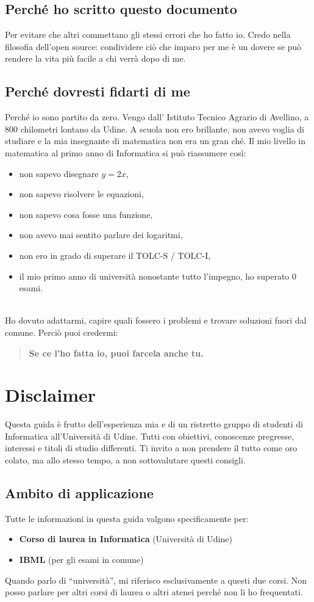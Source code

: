 \documentclass{article}
\begin{document}
\subsection{Perché ho scritto questo documento}
Per evitare che altri commettano gli stessi errori che ho fatto io.  
Credo nella filosofia dell’open source: condividere ciò che imparo per me è un dovere se può rendere la vita più facile a chi verrà dopo di me.\\


\subsection{Perché dovresti fidarti di me}
Perché io sono partito da zero.  
Vengo dall' Istituto Tecnico Agrario di Avellino, a 800 chilometri lontano da Udine. 
A scuola non ero brillante, non avevo voglia di studiare e la mia insegnante di matematica non era un gran ché.  
Il mio livello in matematica al primo anno di Informatica si può riassumere così:
\begin{itemize}
\item non sapevo disegnare $y = 2x$,
\item non sapevo risolvere le equazioni,
\item non sapevo cosa fosse una funzione,
\item non avevo mai sentito parlare dei logaritmi,
\item non ero in grado di superare il TOLC-S / TOLC-I, 
\item il mio primo anno di università nonostante tutto l'impegno, ho superato 0 esami. 
\end{itemize}\\
Ho dovuto adattarmi, capire quali fossero i problemi e trovare soluzioni fuori dal comune. 
Perciò puoi credermi:
\begin{quote}
\textbf{Se ce l'ho fatta io, puoi farcela anche tu.}
\end{quote}


\section{Disclaimer}
Questa guida è frutto dell'esperienza mia e di un ristretto gruppo di studenti di Informatica all'Università di Udine. Tutti con obiettivi, conoscenze pregresse, interessi e titoli di studio differenti.
Ti invito a non prendere il tutto come oro colato, ma allo stesso tempo, a non sottovalutare questi consigli.


\subsection{Ambito di applicazione}
Tutte le informazioni in questa guida valgono specificamente per:
\begin{itemize}
    \item \textbf{Corso di laurea in Informatica} (Università di Udine)
    \item \textbf{IBML} (per gli esami in comune)
\end{itemize}
Quando parlo di ``università'', mi riferisco esclusivamente a questi due corsi. Non posso parlare per altri corsi di laurea o altri atenei perché non li ho frequentati.
\end{document}
